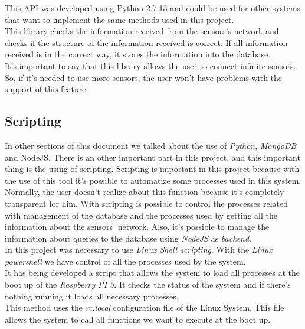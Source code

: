 This API was developed using Python 2.7.13 and could be used for other systems that want to implement the same methods used in this project.\\

This library checks the information received from the sensors's network and checks if the structure of the information received is correct. If all information received is in the correct way, it stores the information into the database.\\

It's important to say that this library allows the user to connect infinite sensors. So, if it's needed to use more sensors, the user won't have problems with the support of this feature.

\subsection{Scripting}

In other sections of this document we talked about the use of \textit{Python}, \textit{MongoDB} and NodeJS. There is an other important part in this project, and this important thing is the using of scripting. Scripting is important in this project because with the use of this tool it's possible to automatize some processes used in this system.\\

Normally, the user doesn't realize about this function because it's completely transparent for him. With scripting is possible to control the processes related with management of the database and the processes used by getting all the information about the sensors' network. Also, it's possible to manage the information about queries to the database using \textit{NodeJS} as \textit{backend}.\\

In this project was necessary to use \textit{Linux Shell scripting}. With the \textit{Linux powershell} we have control of all the processes used by the system.\\

It has being developed a script that allows the system to load all processes at the boot up of the \textit{Raspberry PI 3}. It checks the status of the system and if there's nothing running it loads all necessary processes.\\

This method uses the \textit{rc.local} configuration file of the Linux System. This file allows the system to call all functions we want to execute at the boot up.

